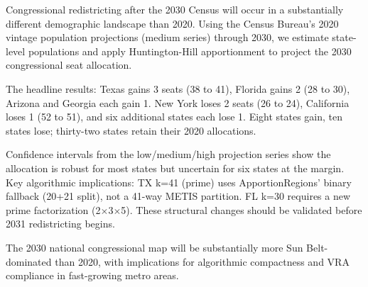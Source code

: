 Congressional redistricting after the 2030 Census will occur in a substantially different
demographic landscape than 2020. Using the Census Bureau's 2020 vintage population
projections (medium series) through 2030, we estimate state-level populations and apply
Huntington-Hill apportionment to project the 2030 congressional seat allocation.

The headline results: Texas gains 3 seats (38 to 41), Florida gains 2 (28 to 30),
Arizona and Georgia each gain 1. New York loses 2 seats (26 to 24), California loses 1
(52 to 51), and six additional states each lose 1. Eight states gain, ten states lose;
thirty-two states retain their 2020 allocations.

Confidence intervals from the low/medium/high projection series show the allocation
is robust for most states but uncertain for six states at the margin. Key algorithmic
implications: TX k=41 (prime) uses ApportionRegions' binary fallback (20+21 split),
not a 41-way METIS partition. FL k=30 requires a new prime factorization (2$\times$3$\times$5).
These structural changes should be validated before 2031 redistricting begins.

The 2030 national congressional map will be substantially more Sun Belt-dominated
than 2020, with implications for algorithmic compactness and VRA compliance in
fast-growing metro areas.
